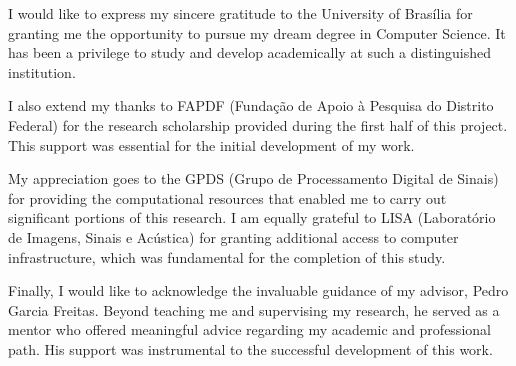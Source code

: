 I would like to express my sincere gratitude to the University of Brasília for granting me the opportunity to pursue my dream degree in Computer Science. It has been a privilege to study and develop academically at such a distinguished institution.

I also extend my thanks to FAPDF (Fundação de Apoio à Pesquisa do Distrito Federal) for the research scholarship provided during the first half of this project. This support was essential for the initial development of my work.

My appreciation goes to the GPDS (Grupo de Processamento Digital de Sinais) for providing the computational resources that enabled me to carry out significant portions of this research. I am equally grateful to LISA (Laboratório de Imagens, Sinais e Acústica) for granting additional access to computer infrastructure, which was fundamental for the completion of this study.

Finally, I would like to acknowledge the invaluable guidance of my advisor, Pedro Garcia Freitas. Beyond teaching me and supervising my research, he served as a mentor who offered meaningful advice regarding my academic and professional path. His support was instrumental to the successful development of this work.